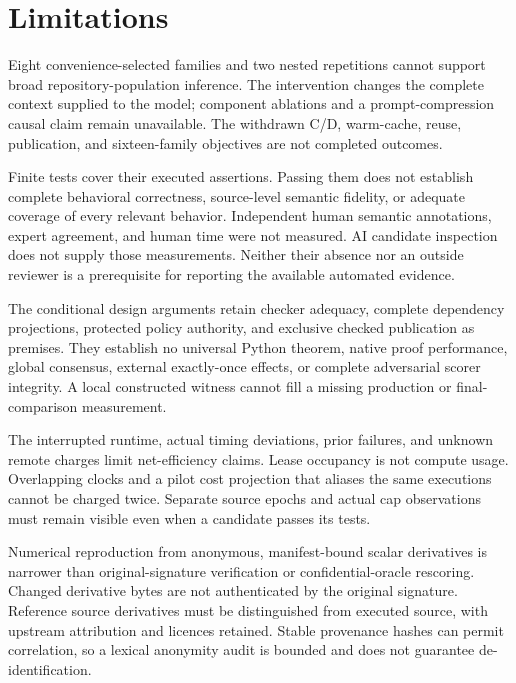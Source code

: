\section{Limitations}
\label{sec:limitations}

Eight convenience-selected families and two nested repetitions cannot support
broad repository-population inference. The intervention changes the complete
context supplied to the model; component ablations and a prompt-compression
causal claim remain unavailable. The withdrawn C/D, warm-cache, reuse,
publication, and sixteen-family objectives are not completed outcomes.

Finite tests cover their executed assertions. Passing them does not establish
complete behavioral correctness, source-level semantic fidelity, or adequate
coverage of every relevant behavior. Independent human semantic annotations,
expert agreement, and human time were not measured. AI candidate inspection
does not supply those measurements. Neither their absence nor an outside
reviewer is a prerequisite for reporting the available automated evidence.

The conditional design arguments retain checker adequacy, complete dependency
projections, protected policy authority, and exclusive checked publication as
premises. They establish no universal Python theorem, native proof performance,
global consensus, external exactly-once effects, or complete adversarial scorer
integrity. A local constructed witness cannot fill a missing production or
final-comparison measurement.

The interrupted runtime, actual timing deviations, prior failures, and unknown
remote charges limit net-efficiency claims. Lease occupancy is not compute
usage. Overlapping clocks and a pilot cost projection that aliases the same
executions cannot be charged twice. Separate source epochs and actual cap
observations must remain visible even when a candidate passes its tests.

Numerical reproduction from anonymous, manifest-bound scalar derivatives is
narrower than original-signature verification or confidential-oracle rescoring.
Changed derivative bytes are not authenticated by the original signature.
Reference source derivatives must be distinguished from executed source, with
upstream attribution and licences retained. Stable provenance hashes can permit
correlation, so a lexical anonymity audit is bounded and does not guarantee
de-identification.

